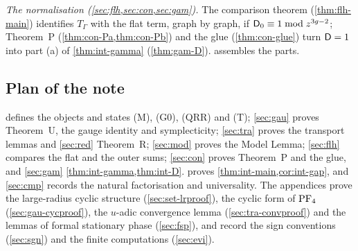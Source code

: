 \emph{The normalisation (\cref{sec:flh,sec:con,sec:gam}).} The comparison theorem (\cref{thm:flh-main}) identifies $T_\Gamma$ with the flat term, graph by graph, if $\mathsf{D}_0\equiv1\bmod z^{3g-2}$; Theorem~P (\cref{thm:con-Pa,thm:con-Pb}) and the glue (\cref{thm:con-glue}) turn $\mathsf{D}=1$ into part (a) of \cref{thm:int-gamma} (\cref{thm:gam-D}).  assembles the parts.

\subsection{Plan of the note}
\label{sec:int-plan}

 defines the objects and states (M), (G0), (QRR) and (T); \cref{sec:gau} proves Theorem~U, the gauge identity and symplecticity; \cref{sec:tra} proves the transport lemmas and \cref{sec:red} Theorem~R; \cref{sec:mod} proves the Model Lemma; \cref{sec:flh} compares the flat and the outer sums; \cref{sec:con} proves Theorem~P and the glue, and \cref{sec:gam} \cref{thm:int-gamma,thm:int-D}.  proves \cref{thm:int-main,cor:int-gap}, and \cref{sec:cmp} records the natural factorisation and universality. The appendices prove the large-radius cyclic structure (\cref{sec:set-lrproof}), the cyclic form of $\mathrm{PF}_{4}$ (\cref{sec:gau-cycproof}), the $u$-adic convergence lemma (\cref{sec:tra-convproof}) and the lemmas of formal stationary phase (\cref{sec:fsp}), and record the sign conventions (\cref{sec:sgn}) and the finite computations (\cref{sec:evi}).
